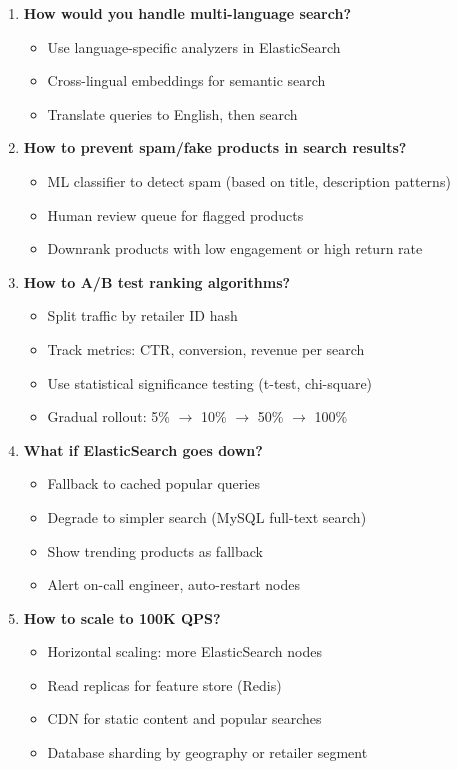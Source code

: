 \documentclass[11pt,letterpaper]{article}
\begin{document}
\begin{enumerate}
    \item \textbf{How would you handle multi-language search?}
    \begin{itemize}
        \item Use language-specific analyzers in ElasticSearch
        \item Cross-lingual embeddings for semantic search
        \item Translate queries to English, then search
    \end{itemize}

    \item \textbf{How to prevent spam/fake products in search results?}
    \begin{itemize}
        \item ML classifier to detect spam (based on title, description patterns)
        \item Human review queue for flagged products
        \item Downrank products with low engagement or high return rate
    \end{itemize}

    \item \textbf{How to A/B test ranking algorithms?}
    \begin{itemize}
        \item Split traffic by retailer ID hash
        \item Track metrics: CTR, conversion, revenue per search
        \item Use statistical significance testing (t-test, chi-square)
        \item Gradual rollout: 5\% $\rightarrow$ 10\% $\rightarrow$ 50\% $\rightarrow$ 100\%
    \end{itemize}

    \item \textbf{What if ElasticSearch goes down?}
    \begin{itemize}
        \item Fallback to cached popular queries
        \item Degrade to simpler search (MySQL full-text search)
        \item Show trending products as fallback
        \item Alert on-call engineer, auto-restart nodes
    \end{itemize}

    \item \textbf{How to scale to 100K QPS?}
    \begin{itemize}
        \item Horizontal scaling: more ElasticSearch nodes
        \item Read replicas for feature store (Redis)
        \item CDN for static content and popular searches
        \item Database sharding by geography or retailer segment
    \end{itemize}
\end{enumerate}
\end{document}
